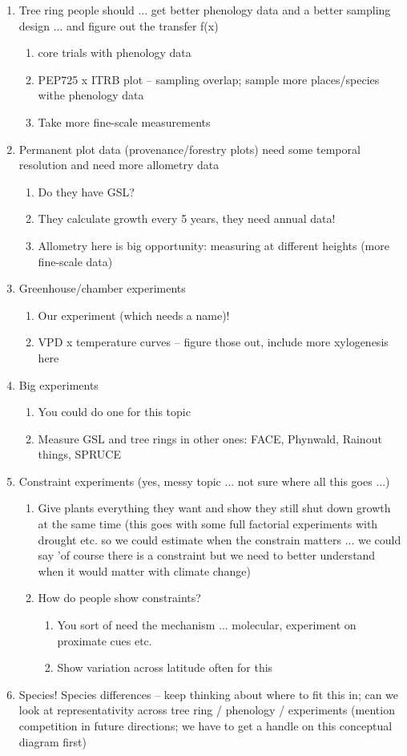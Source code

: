 \documentclass[11pt,letter]{article}
\begin{document}
\begin{enumerate}
\item Tree ring people should ... get better phenology data and a better sampling design ... and figure out the transfer f(x)
\begin{enumerate}
\item core trials with phenology data
\item PEP725 x ITRB plot -- sampling overlap; sample more places/species withe phenology data
\item Take more fine-scale measurements
\end{enumerate}
\item Permanent plot data (provenance/forestry plots) need some temporal resolution and need more allometry data
\begin{enumerate}
\item Do they have GSL? 
\item They calculate growth every 5 years, they need annual data!
\item Allometry here is big opportunity: measuring at different heights (more fine-scale data)
\end{enumerate}
\item Greenhouse/chamber experiments
\begin{enumerate}
\item Our experiment (which needs a name)!
\item VPD x temperature curves -- figure those out, include more xylogenesis here
\end{enumerate}
\item Big experiments
\begin{enumerate}
\item You could do one for this topic
\item Measure GSL and tree rings in other ones: FACE, Phynwald, Rainout things, SPRUCE 
\end{enumerate}
\item Constraint experiments (yes, messy topic ... not sure where all this goes ...)
\begin{enumerate}
\item Give plants everything they want and show they still shut down growth at the same time (this goes with some full factorial experiments with drought etc. so we could estimate when the constrain matters ... we could say 'of course there is a constraint but we need to better understand when it would matter with climate change)
\item How do people show constraints?
\begin{enumerate}
\item You sort of need the mechanism ... molecular, experiment on proximate cues etc.
\item Show variation across latitude often for this
\end{enumerate}
\end{enumerate}
\item Species! Species differences -- keep thinking about where to fit this in; can we look at representativity across tree ring / phenology / experiments (mention competition in future directions; we have to get a handle on this conceptual diagram first)
\end{enumerate}
\end{document}
